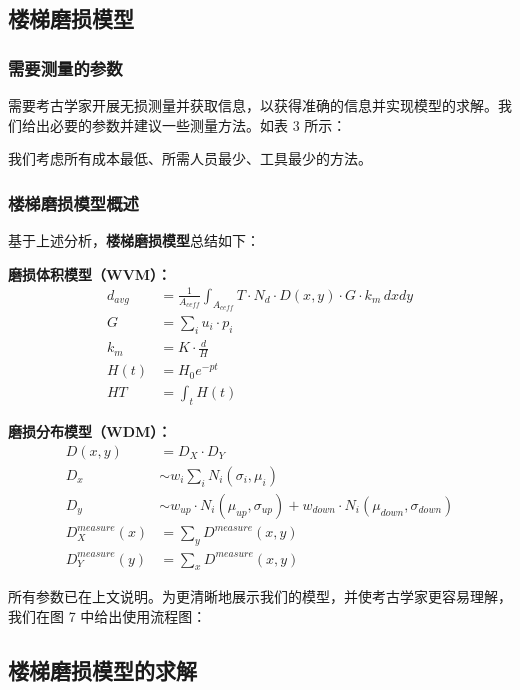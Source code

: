 \documentclass[11pt,a4paper]{ctexart}
\begin{document}
\subsection{楼梯磨损模型}

\subsubsection{需要测量的参数}

需要考古学家开展无损测量并获取信息，以获得准确的信息并实现模型的求解。我们给出必要的参数并建议一些测量方法。如表 3 所示：

我们考虑所有成本最低、所需人员最少、工具最少的方法。

\subsubsection{楼梯磨损模型概述}

基于上述分析，\textbf{楼梯磨损模型}总结如下：

\textbf{磨损体积模型（WVM）：}
\begin{equation}
\begin{aligned}
d_{avg}&=\frac{1}{A_{ceff}}\int_{A_{ceff}}T\cdot N_d\cdot D(x,y)\cdot G\cdot k_m\,dxdy\\
G&=\sum_i u_i\cdot p_i\\
k_m&=K\cdot\frac{d}{H}\\
H(t)&=H_0e^{-pt}\\
HT&=\int_t H(t)
\end{aligned}
\tag{3.16}
\end{equation}

\textbf{磨损分布模型（WDM）：}
\begin{equation}
\begin{aligned}
D(x,y)&=D_X\cdot D_Y\\
D_x&\sim w_i\sum_i N_i(\sigma_i,\mu_i)\\
D_y&\sim w_{up}\cdot N_i(\mu_{up},\sigma_{up})+w_{down}\cdot N_i(\mu_{down},\sigma_{down})\\
D_X^{measure}(x)&=\sum_y D^{measure}(x,y)\\
D_Y^{measure}(y)&=\sum_x D^{measure}(x,y)
\end{aligned}
\tag{3.17}
\end{equation}

所有参数已在上文说明。为更清晰地展示我们的模型，并使考古学家更容易理解，我们在图 7 中给出使用流程图：

\subsection{楼梯磨损模型的求解}
\end{document}
